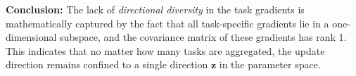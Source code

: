 \textbf{Conclusion:} The lack of \emph{directional diversity} in the task gradients is mathematically captured by the fact that all task-specific gradients lie in a one-dimensional subspace, and the covariance matrix of these gradients has rank 1. This indicates that no matter how many tasks are aggregated, the update direction remains confined to a single direction \(\mathbf{z}\) in the parameter space.
